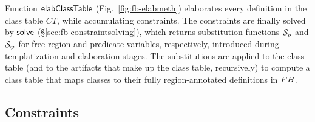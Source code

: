 

Function ${\sf elabClassTable}$ (Fig.~\ref{fig:fb-elabmeth}) elaborates
every definition in the class table $CT$, while accumulating
constraints. The constraints are finally solved by ${\sf solve}$
(\S\ref{sec:fb-constraintsolving}), which returns substitution
functions $\mathcal{S}_\rho$ and $\mathcal{S}_\varphi$ for free region and
predicate variables, respectively, introduced during templatization
and elaboration stages. The substitutions are applied to the class
table (and to the artifacts that make up the class table, recursively)
to compute a class table that maps classes to their fully
region-annotated definitions in ${\sc FB}$.


\subsection{Constraints}
\label{sec:fb-constraintsem}

